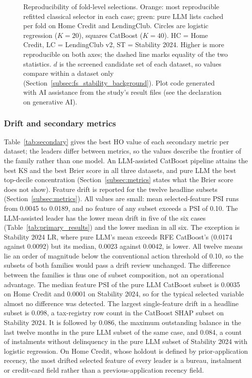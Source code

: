 \documentclass[final,5p,twocolumn]{elsarticle}
\newcommand{\Kfeat}{K}
\begin{document}
\begin{figure}[htbp]
\begin{tikzpicture}
\end{tikzpicture}
\caption{Reproducibility of fold-level selections. Orange: most reproducible refitted classical selector in each case; green: pure LLM lists cached per fold on Home Credit and LendingClub. Circles are logistic regression ($\Kfeat=20$), squares CatBoost ($\Kfeat=40$). HC = Home Credit, LC = LendingClub v2, ST = Stability 2024. Higher is more reproducible on both axes; the dashed line marks equality of the two statistics. $d$ is the screened candidate set of each dataset, so values compare within a dataset only (Section~\ref{subsec:fs_stability_background}). Plot code generated with AI assistance from the study's result files (see the declaration on generative AI).}
\label{fig:stability}
\end{figure}

\subsubsection{Drift and secondary metrics}
\label{subsec:secondary_results}

Table~\ref{tab:secondary} gives the best HO value of each secondary metric per dataset; the leaders differ between metrics, so the values describe the frontier of the family rather than one model. An LLM-assisted CatBoost pipeline attains the best KS and the best Brier score in all three datasets, and pure LLM the best top-decile concentration (Section~\ref{subsec:metrics} states what the Brier score does not show). Feature drift is reported for the twelve headline subsets (Section~\ref{subsec:metrics}). All values are small: mean selected-feature PSI runs from 0.0045 to 0.0189, and no feature of any subset exceeds a PSI of 0.10. The LLM-assisted leader has the lower mean drift in five of the six cases (Table~\ref{tab:primary_results}) and the lower median in all six. The exception is Stability 2024 LR, where pure LLM's mean exceeds RFE CatBoost's (0.0174 against 0.0092) but its median, 0.0023 against 0.0042, is lower. All twelve means lie an order of magnitude below the conventional action threshold of 0.10, so the subsets of both families would pass a drift review unchanged. The difference between the families is thus one of subset composition, not an operational advantage. The median feature PSI of the pure LLM CatBoost subset is 0.0035 on Home Credit and 0.0001 on Stability 2024, so for the typical selected variable almost no difference was detected. The largest single-feature drift in a headline subset is 0.098, a tax-registry row count in the CatBoost SHAP subset on Stability 2024. It is followed by 0.086, the maximum outstanding balance in the last twelve months in the pure LLM subset of the same case, and 0.084, a count of instalments without delinquency in the pure LLM subset of Stability 2024 with logistic regression. On Home Credit, whose holdout is defined by prior-application recency, the most drifted selected feature of every leader is a bureau, instalment or credit-card field rather than a previous-application recency field.
\end{document}

